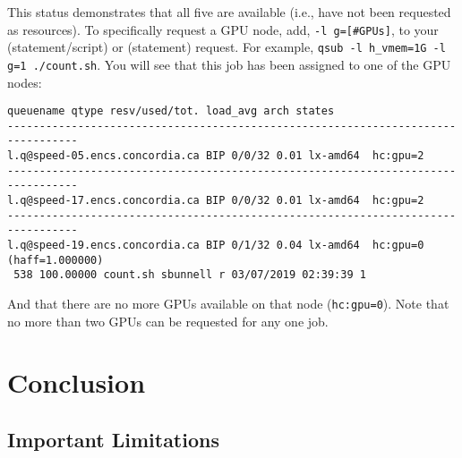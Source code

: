 \documentclass{easychair}
\begin{document}
This status demonstrates that all five are available (i.e., have not been 
requested as resources). To specifically request a GPU node, add,
\texttt{-l g=[\#GPUs]}, to your  (statement/script) or
 (statement) request. For example,
\texttt{qsub -l h\_vmem=1G -l g=1 ./count.sh}. You 
will see that this job has been assigned to one of the GPU nodes:

\small
\begin{verbatim}
queuename qtype resv/used/tot. load_avg arch states 
--------------------------------------------------------------------------------- 
l.q@speed-05.encs.concordia.ca BIP 0/0/32 0.01 lx-amd64  hc:gpu=2 
--------------------------------------------------------------------------------- 
l.q@speed-17.encs.concordia.ca BIP 0/0/32 0.01 lx-amd64  hc:gpu=2 
--------------------------------------------------------------------------------- 
l.q@speed-19.encs.concordia.ca BIP 0/1/32 0.04 lx-amd64  hc:gpu=0 (haff=1.000000) 
 538 100.00000 count.sh sbunnell r 03/07/2019 02:39:39 1
\end{verbatim}
\normalsize

And that there are no more GPUs available on that node (\texttt{hc:gpu=0}). Note that no 
more than two GPUs can be requested for any one job. 

\section{Conclusion}
\label{sect:conclusion}

\subsection{Important Limitations}
\label{sect:limitations}
\end{document}
